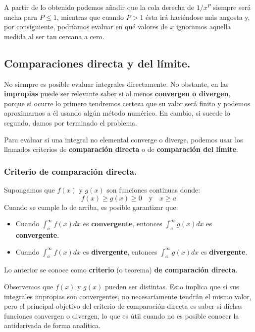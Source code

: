 \documentclass[12pt]{article}
\begin{document}
A partir de lo obtenido podemos añadir que la cola derecha de $1/x^{P}$ siempre será ancha para $P \leq 1$, mientras que cuando $P > 1$ ésta irá haciéndose más angosta y, por consiguiente, podríamos evaluar en qué valores de $x$ ignoramos aquella medida al ser tan cercana a cero.

\subsection{Comparaciones directa y del límite.}

No siempre es posible evaluar integrales directamente. No obstante, en las \textbf{impropias} puede ser relevante saber si al menos \textbf{convergen o divergen}, porque si ocurre lo primero tendremos certeza que su valor será finito y podemos aproximarnos a él usando algún método numérico. En cambio, si sucede lo segundo, damos por terminado el problema.

Para evaluar si una integral no elemental converge o diverge, podemos usar los llamados criterios de \textbf{comparación directa} o de \textbf{comparación del límite}.

\subsubsection{Criterio de comparación directa.}

Supongamos que $f(x)$ y $g(x)$ son funciones continuas donde:
\[
  f(x) \geq g(x) \geq 0 \quad \text{y} \quad x \geq a
\]
Cuando se cumple lo de arriba, es posible garantizar que:

\begin{itemize}
\item Cuando $\displaystyle \int_{a}^{\infty} f(x)dx$ es \textbf{convergente}, entonces $\displaystyle \int_{a}^{\infty} g(x)dx$ es \textbf{convergente}.
\item Cuando $\displaystyle \int_{a}^{\infty} f(x)dx$ es \textbf{divergente}, entonces $\displaystyle \int_{a}^{\infty} g(x)dx$ es \textbf{divergente}.
\end{itemize}

Lo anterior se conoce como \textbf{criterio} (o teorema) \textbf{de comparación directa}.

Observemos que $f(x)$ y $g(x)$ pueden ser distintas. Esto implica que si sus integrales impropias son convergentes, no necesariamente tendrán el mismo valor, pero el principal objetivo del criterio de comparación directa es saber si dichas funciones convergen o divergen, lo que es útil cuando no es posible conocer la antiderivada de forma analítica.
\end{document}
